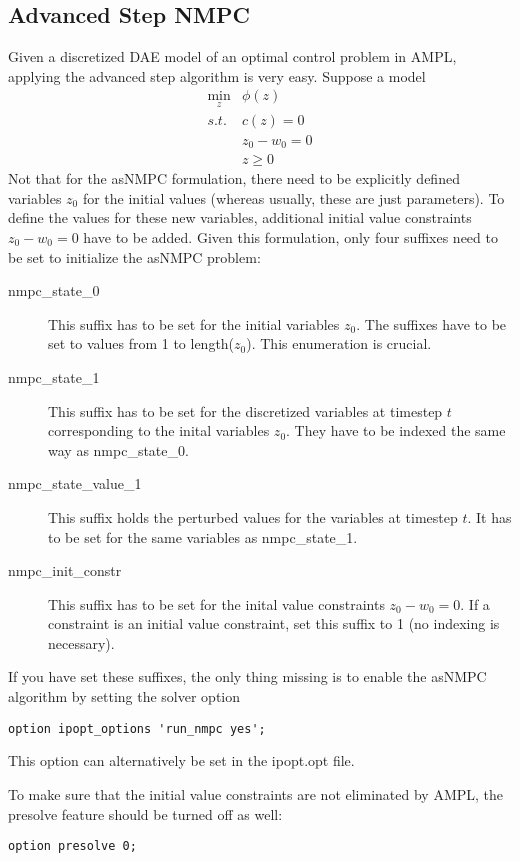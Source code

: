 \documentclass[a4paper]{article}
\begin{document}
\subsection{Advanced Step NMPC}
Given a discretized DAE model of an optimal control problem in AMPL, applying the advanced step algorithm is very easy. Suppose a model
\begin{equation}
  \label{discretized_OCP_asnmpc}
  \begin{array}{cc}
    \min\limits_z& \phi(z)\\
    s.t.& c(z) = 0\\
    & z_0-w_0 = 0\\
    & z\geq 0
  \end{array}
\end{equation}
Not that for the asNMPC formulation, there need to be explicitly defined variables $z_0$ for the initial values (whereas usually, these are just parameters). To define the values for these new variables, additional initial value constraints $z_0-w_0=0$ have to be added. Given this formulation, only four suffixes need to be set to initialize the asNMPC problem:
\begin{description}
\item[nmpc\_state\_0] This suffix has to be set for the initial variables $z_0$. The suffixes have to be set to values from 1 to length($z_0$). This enumeration is crucial.
\item[nmpc\_state\_1] This suffix has to be set for the discretized variables at timestep $t$ corresponding to the inital variables $z_0$. They have to be indexed the same way as nmpc\_state\_0.
\item[nmpc\_state\_value\_1] This suffix holds the perturbed values for the variables at timestep $t$. It has to be set for the same variables as nmpc\_state\_1.
\item[nmpc\_init\_constr] This suffix has to be set for the inital value constraints $z_0 - w_0=0$. If a constraint is an initial value constraint, set this suffix to 1 (no indexing is necessary).
\end{description}
If you have set these suffixes, the only thing missing is to enable the asNMPC algorithm by setting the solver option 
\begin{verbatim}
option ipopt_options 'run_nmpc yes';
\end{verbatim}
This option can alternatively be set in the ipopt.opt file.

To make sure that the initial value constraints are not eliminated by AMPL, the presolve feature should be turned off as well:
\begin{verbatim}
option presolve 0;
\end{verbatim}
\end{document}
